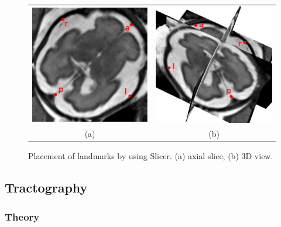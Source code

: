 \begin{figure}[t]
\centering
\begin{tabular}{cc}
\includegraphics[width=0.35\columnwidth]{lmks_axial.eps}&
\includegraphics[width=0.35\columnwidth]{lmks_3D.eps}\\
{(a)}&{(b)}\\
\end{tabular}
\caption{Placement of landmarks by using Slicer. (a) axial slice, (b) 3D view.}
\label{fig:landmarks}
\end{figure}

\subsection{Tractography}
    \subsubsection*{Theory}

